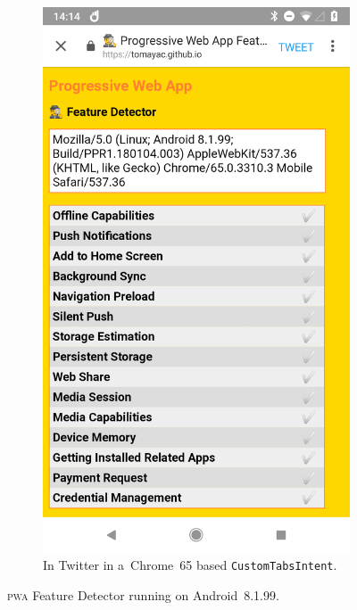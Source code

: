 \documentclass[sigconf]{acmart}
\begin{document}
\begin{figure}[h]
\begin{subfigure}[t]{0.475\columnwidth}
    \includegraphics[width=1\columnwidth,frame]{pwa-feature-detector-twitter-android-chrome65}
    \caption[\textsc{pwa} Feature Detector running in Twitter.]{
      In Twitter in a~Chrome~65 based \texttt{CustomTabsIntent}.}
    \label{fig:twitter-android-chrome65}
  \end{subfigure}
  \caption{\textsc{pwa} Feature Detector running on Android~8.1.99.}    
\end{figure}
\end{document}
